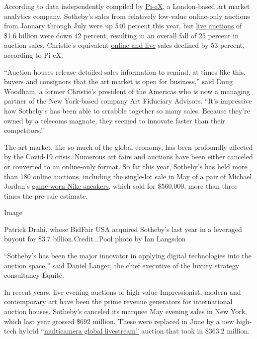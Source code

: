 According to data independently compiled by
\href{https://pi-ex.co/}{Pi-eX}, a London-based art market analytics
company, Sotheby's sales from relatively low-value online-only auctions
from January through July were up 540 percent this year, but
\href{https://www.nytimes.com/2020/05/29/arts/design/sothebys-remote-auctions-coronavirus.html}{live
auctions} of \$1.6 billion were down 42 percent, resulting in an overall
fall of 25 percent in auction sales. Christie's equivalent
\href{https://www.nytimes.com/2020/07/10/arts/design/christies-auction.html}{online
and live} sales declined by 53 percent, according to Pi-eX.

``Auction houses release detailed sales information to remind, at times
like this, buyers and consignors that the art market is open for
business,'' said Doug Woodham, a former Christie's president of the
Americas who is now a managing partner of the New York-based company Art
Fiduciary Advisors. ``It's impressive how Sotheby's has been able to
scrabble together so many sales. Because they're owned by a telecoms
magnate, they seemed to innovate faster than their competitors.''

The art market, like so much of the global economy, has been profoundly
affected by the Covid-19 crisis. Numerous art fairs and auctions have
been either canceled or converted to an online-only format. So far this
year, Sotheby's has held more than 180 online auctions, including the
single-lot sale in May of a pair of Michael Jordan's
\href{https://www.nytimes.com/2020/05/18/sports/air-jordan-sneakers-auction-record.html}{game-worn
Nike sneakers}, which sold for \$560,000, more than three times the
pre-sale estimate.

Image

Patrick Drahi, whose BidFair USA acquired Sotheby's last year in a
leveraged buyout for \$3.7 billion.Credit...Pool photo by Ian Langsdon

``Sotheby's has been the major innovator in applying digital
technologies into the auction space,'' said Daniel Langer, the chief
executive of the luxury strategy consultancy Équité.

In recent years, live evening auctions of high-value Impressionist,
modern and contemporary art have been the prime revenue generators for
international auction houses. Sotheby's canceled its marquee May evening
sales in New York, which last year grossed \$692 million. These were
replaced in June by a new high-tech hybrid
``\href{https://www.nytimes.com/2020/06/30/arts/design/sothebys-online-auction.html}{multicamera
global livestream''} auction that took in \$363.2 million.

